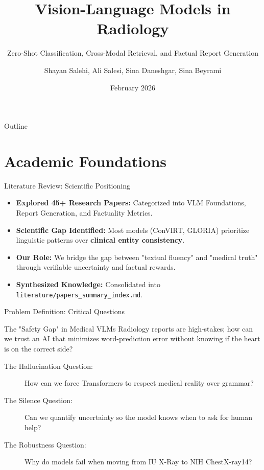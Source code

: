 \documentclass[aspectratio=169]{beamer}
\title[Radiology VLMs]{Vision-Language Models in Radiology}
\subtitle{Zero-Shot Classification, Cross-Modal Retrieval, and Factual Report Generation}
\author[Salehi, Salesi, Daneshgar, Beyrami]{Shayan Salehi, Ali Salesi, Sina Daneshgar, Sina Beyrami}
\institute[SUT]{
  Department of Computer Engineering\\
  Sharif University of Technology
}
\date{February 2026}
\begin{document}
\begin{frame}
  \titlepage
\end{frame}

\begin{frame}{Outline}
  \tableofcontents[sections]
\end{frame}

\section{Academic Foundations}

\begin{frame}{Literature Review: Scientific Positioning}
  \begin{itemize}
    \item \textbf{Explored 45+ Research Papers:} Categorized into VLM Foundations, Report Generation, and Factuality Metrics.
    \item \textbf{Scientific Gap Identified:} Most models (ConVIRT, GLORIA) prioritize linguistic patterns over \textbf{clinical entity consistency}.
    \item \textbf{Our Role:} We bridge the gap between "textual fluency" and "medical truth" through verifiable uncertainty and factual rewards.
    \item \textbf{Synthesized Knowledge:} Consolidated into \texttt{literature/papers\_summary\_index.md}.
  \end{itemize}
\end{frame}

\begin{frame}{Problem Definition: Critical Questions}
  \begin{block}{The "Safety Gap" in Medical VLMs}
    Radiology reports are high-stakes; how can we trust an AI that minimizes word-prediction error without knowing if the heart is on the correct side?
  \end{block}
  \begin{description}
    \item[The Hallucination Question:] How can we force Transformers to respect medical reality over grammar?
    \item[The Silence Question:] Can we quantify uncertainty so the model knows when to ask for human help?
    \item[The Robustness Question:] Why do models fail when moving from IU X-Ray to NIH ChestX-ray14?
  \end{description}
\end{frame}
\end{document}
